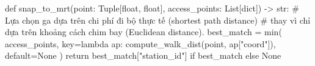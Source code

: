 def snap_to_mrt(point: Tuple[float, float], access_points: List[dict]) -> str:
    # Lựa chọn ga dựa trên chi phí đi bộ thực tế (shortest path distance)
    # thay vì chỉ dựa trên khoảng cách chim bay (Euclidean distance).
    best_match = min(
        access_points,
        key=lambda ap: compute_walk_dist(point, ap["coord"]),
        default=None
    )
    return best_match["station_id"] if best_match else None
